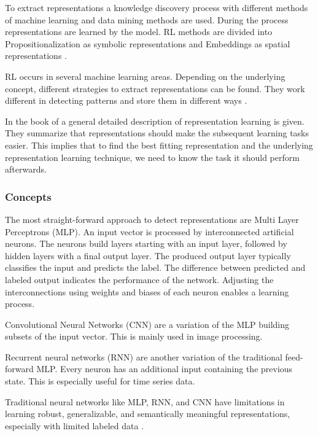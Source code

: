 To extract representations a knowledge discovery process with different methods of machine learning and data mining methods are used. During the process representations are learned by the model. RL methods are divided into Propositionalization as symbolic representations and Embeddings as spatial representations \cite[p. 4]{lavrac_representation_2021}.

RL occurs in several machine learning areas. Depending on the underlying concept, different strategies to extract representations can be found. They work different in detecting patterns and store them in different ways \cite{bishop_pattern_2006}.

In the book of \cite[p. 525]{goodfellow_deep_2016} a general detailed description of representation learning is given. They summarize that representations should make the subsequent learning tasks easier. This implies that to find the best fitting representation and the underlying representation learning technique, we need to know the task it should perform afterwards.
\subsubsection{Concepts}
The most straight-forward approach to detect representations are Multi Layer Perceptrons (MLP). An input vector is processed by interconnected artificial neurons. The neurons build layers starting with an input layer, followed by hidden layers with a final output layer. The produced output layer typically classifies the input and predicts the label. The difference between predicted and labeled output indicates the performance of the network. Adjusting the interconnections using weights and biases of each neuron enables a learning process. \cite{nielsen_neural_2015}

Convolutional Neural Networks (CNN) are a variation of the MLP building subsets of the input vector. This is mainly used in image processing.

Recurrent neural networks (RNN) are another variation of the traditional feed-forward MLP. Every neuron has an additional input containing the previous state. This is especially useful for time series data.

Traditional neural networks like MLP, RNN, and CNN have limitations in learning robust, generalizable, and semantically meaningful representations, especially with limited labeled data \cite{shi_trade-off_2023}.

